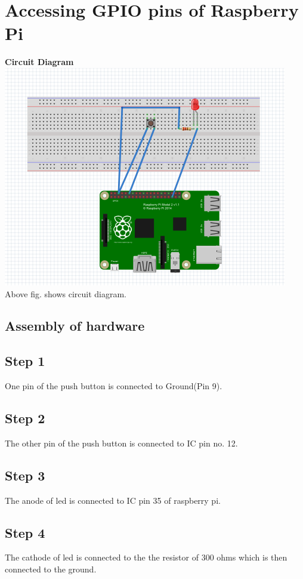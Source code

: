\documentclass[a4paper,12pt,oneside]{book}
\begin{document}
\section{Accessing GPIO pins of Raspberry Pi}
\flushleft
\textbf{Circuit Diagram}\\
\centering
\includegraphics[scale=0.6]{GPIO}
\flushleft
Above fig. shows circuit diagram.
\subsection*{Assembly of hardware}
\subsection*{Step 1}
One pin of the push button is connected to Ground(Pin 9).
\subsection*{Step 2}
The other pin of the push button is connected to IC pin no. 12.
\subsection*{Step 3}
The anode of led is connected to IC pin 35 of raspberry pi.
\subsection*{Step 4}
The cathode of led is connected to the the resistor of 300 ohms which
is then connected to the ground.
\end{document}

